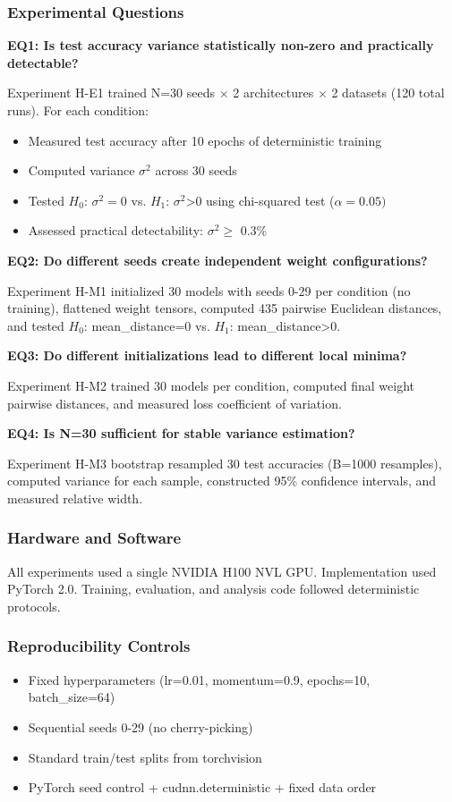 
\subsubsection{Experimental Questions}

\textbf{EQ1: Is test accuracy variance statistically non-zero and practically detectable?}

Experiment H-E1 trained N=30 seeds $\times$ 2 architectures $\times$ 2 datasets (120 total runs). For each condition:
\begin{itemize}
\item Measured test accuracy after 10 epochs of deterministic training
\item Computed variance $\sigma ^2$ across 30 seeds
\item Tested $H_0$: $\sigma ^{2}=0$ vs. $H_1$: $\sigma ^2$>0 using chi-squared test ($\alpha =0.05)$
\item Assessed practical detectability: $\sigma ^2 \geq$ 0.3\%
\end{itemize}

\textbf{EQ2: Do different seeds create independent weight configurations?}

Experiment H-M1 initialized 30 models with seeds 0-29 per condition (no training), flattened weight tensors, computed 435 pairwise Euclidean distances, and tested $H_0$: mean\_distance=0 vs. $H_1$: mean\_distance>0.

\textbf{EQ3: Do different initializations lead to different local minima?}

Experiment H-M2 trained 30 models per condition, computed final weight pairwise distances, and measured loss coefficient of variation.

\textbf{EQ4: Is N=30 sufficient for stable variance estimation?}

Experiment H-M3 bootstrap resampled 30 test accuracies (B=1000 resamples), computed variance for each sample, constructed 95\% confidence intervals, and measured relative width.

\subsubsection{Hardware and Software}

All experiments used a single NVIDIA H100 NVL GPU. Implementation used PyTorch 2.0. Training, evaluation, and analysis code followed deterministic protocols.

\subsubsection{Reproducibility Controls}

\begin{itemize}
\item Fixed hyperparameters (lr=0.01, momentum=0.9, epochs=10, batch\_size=64)
\item Sequential seeds 0-29 (no cherry-picking)
\item Standard train/test splits from torchvision
\item PyTorch seed control + cudnn.deterministic + fixed data order
\end{itemize}
